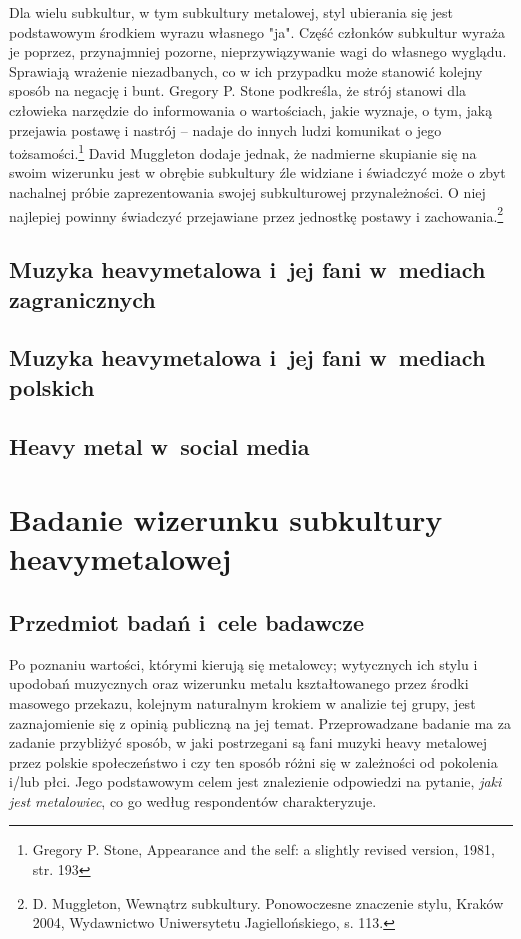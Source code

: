 \documentclass[12pt, a4paper, titlepage]{report}
\begin{document}

Dla wielu subkultur, w tym subkultury metalowej, styl ubierania się jest podstawowym środkiem wyrazu własnego "ja". Część członków subkultur wyraża je poprzez, przynajmniej pozorne, nieprzywiązywanie wagi do własnego wyglądu. Sprawiają wrażenie niezadbanych, co w ich przypadku może stanowić kolejny sposób na negację i bunt. Gregory P. Stone podkreśla, że strój stanowi dla człowieka narzędzie do informowania o wartościach, jakie wyznaje, o tym, jaką przejawia postawę i nastrój -- nadaje do innych ludzi komunikat o jego tożsamości.\footnote{Gregory P. Stone, Appearance and the self: a slightly revised version, 1981, str. 193} David Muggleton dodaje jednak, że nadmierne skupianie się na swoim wizerunku jest w obrębie subkultury źle widziane i świadczyć może o zbyt nachalnej próbie zaprezentowania swojej subkulturowej przynależności. O niej najlepiej powinny świadczyć przejawiane przez jednostkę postawy i zachowania.\footnote{D. Muggleton, Wewnątrz subkultury. Ponowoczesne znaczenie stylu, Kraków 2004, Wydawnictwo Uniwersytetu Jagiellońskiego, s. 113.}
\section{Muzyka heavymetalowa i~jej fani w~mediach zagranicznych}
\section{Muzyka heavymetalowa i~jej fani w~mediach polskich}
\section{Heavy metal w~social media}
\chapter{Badanie wizerunku subkultury heavymetalowej}
\section{Przedmiot badań i~cele badawcze}
Po poznaniu wartości, którymi kierują się metalowcy; wytycznych ich stylu i upodobań muzycznych oraz wizerunku metalu kształtowanego przez środki masowego przekazu, kolejnym naturalnym krokiem w analizie tej grupy, jest zaznajomienie się z opinią publiczną na jej temat.  Przeprowadzane badanie ma za zadanie przybliżyć sposób, w jaki postrzegani są fani muzyki heavy metalowej przez polskie społeczeństwo i czy ten sposób różni się w zależności od pokolenia i/lub płci. Jego podstawowym celem jest znalezienie odpowiedzi na pytanie, \emph{jaki jest metalowiec}, co go według respondentów charakteryzuje. 
\end{document}
